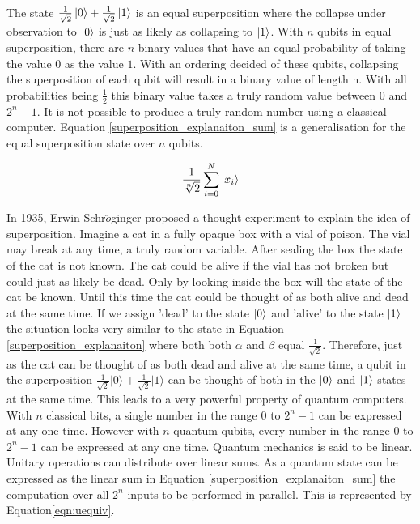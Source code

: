 The state $\frac{1}{\sqrt{2}}\left\vert{0}\right\rangle+\frac{1}{\sqrt{2}}\left\vert{1}\right\rangle$ is an equal superposition where the collapse under observation to $\left\vert{0}\right\rangle$ is just as likely as collapsing to $\left\vert{1}\right\rangle$.
With $n$ qubits in equal superposition, there are $n$ binary values that have an equal probability of taking the value $0$ as the value $1$.
With an ordering decided of these qubits, collapsing the superposition of each qubit will result in a binary value of length n.
With all probabilities being $\frac{1}{2}$ this binary value takes a truly random value between $0$ and $2^n-1$.
It is not possible to produce a truly random number using a classical computer.
Equation \ref{superposition_explanaiton_sum} is a generalisation for the equal superposition state over $n$ qubits.

\begin{equation}
\label{superposition_explanaiton_sum}
\frac{1}{\sqrt[n]{2}}\sum\limits_{i=0}^N \left\vert{x_i}\right\rangle
\end{equation}

In 1935, Erwin Schr$\ddot{o}$ginger\cite{SchroedingersCat} proposed a thought experiment to explain the idea of superposition.
Imagine a cat in a fully opaque box with a vial of poison.
The vial may break at any time, a truly random variable.
After sealing the box the state of the cat is not known.
The cat could be alive if the vial has not broken but could just as likely be dead.
Only by looking inside the box will the state of the cat be known.
Until this time the cat could be thought of as both alive and dead at the same time.
If we assign 'dead' to the state $\left\vert{0}\right\rangle$ and 'alive' to the state $\left\vert{1}\right\rangle$ the situation looks very similar to the state in Equation \ref{superposition_explanaiton} where both both $\alpha$ and $\beta$ equal $\frac{1}{\sqrt{2}}$.
Therefore, just as the cat can be thought of as both dead and alive at the same time, a qubit in the superposition $\frac{1}{\sqrt{2}}\vert0\rangle+\frac{1}{\sqrt{2}}\vert1\rangle$ can be thought of both in the $\left\vert{0}\right\rangle$ and $\left\vert{1}\right\rangle$ states at the same time.
This leads to a very powerful property of quantum computers.
With $n$ classical bits, a single number in the range $0$ to $2^n-1$ can be expressed at any one time.
However with $n$ quantum qubits, every number in the range $0$ to $2^n-1$ can be expressed at any one time.
Quantum mechanics is said to be linear.
Unitary operations can distribute over linear sums.
As a quantum state can be expressed as the linear sum in Equation \ref{superposition_explanaiton_sum} the computation over all $2^n$ inputs to be performed in parallel.
This is represented by Equation\ref{eqn:uequiv}.%

